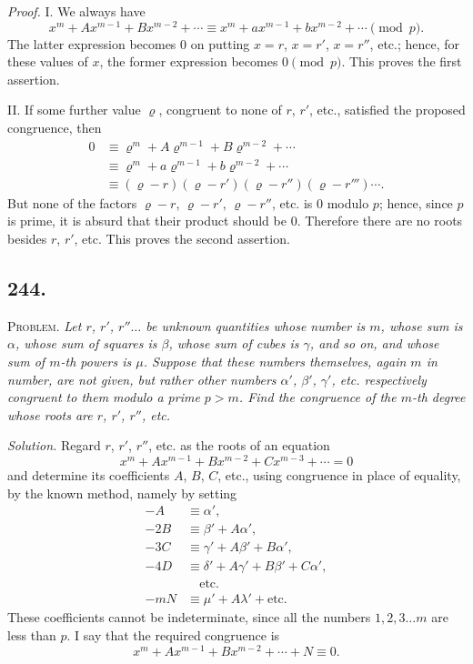 \documentclass[12pt]{article}
\begin{document}
\textit{Proof.} I. We always have
\[
x^m+A x^{m-1}+B x^{m-2}+\cdots \equiv x^m+a x^{m-1}+b x^{m-2}+\cdots \pmod p.
\]
The latter expression becomes $0$ on putting $x=r$, $x=r'$, $x=r''$, etc.; hence, for these values of $x$, the former expression becomes $0\pmod p$. This proves the first assertion.

II. If some further value $\varrho$, congruent to none of $r$, $r'$, etc., satisfied the proposed congruence, then
\[
\begin{aligned}
0&\equiv \varrho^m+A\varrho^{m-1}+B\varrho^{m-2}+\cdots \\
&\equiv \varrho^m+a\varrho^{m-1}+b\varrho^{m-2}+\cdots \\
&\equiv (\varrho-r)(\varrho-r')(\varrho-r'')(\varrho-r''')\cdots .
\end{aligned}
\]
But none of the factors $\varrho-r$, $\varrho-r'$, $\varrho-r''$, etc. is $0$ modulo $p$; hence, since $p$ is prime, it is absurd that their product should be $0$. Therefore there are no roots besides $r$, $r'$, etc. This proves the second assertion.

\subsection*{244.}
\textsc{Problem.} \textit{Let $r$, $r'$, $r''\ldots$ be unknown quantities whose number is $m$, whose sum is $\alpha$, whose sum of squares is $\beta$, whose sum of cubes is $\gamma$, and so on, and whose sum of $m$-th powers is $\mu$. Suppose that these numbers themselves, again $m$ in number, are not given, but rather other numbers $\alpha'$, $\beta'$, $\gamma'$, etc. respectively congruent to them modulo a prime $p>m$. Find the congruence of the $m$-th degree whose roots are $r$, $r'$, $r''$, etc.}

\textit{Solution.} Regard $r$, $r'$, $r''$, etc. as the roots of an equation
\[
x^m+A x^{m-1}+B x^{m-2}+C x^{m-3}+\cdots=0
\]
and determine its coefficients $A$, $B$, $C$, etc., using congruence in place of equality, by the known method, namely by setting
\[
\begin{aligned}
-A&\equiv \alpha',\\
-2B&\equiv \beta' + A\alpha',\\
-3C&\equiv \gamma' + A\beta' + B\alpha',\\
-4D&\equiv \delta' + A\gamma' + B\beta' + C\alpha',\\
&\quad\text{etc.}\\
-mN&\equiv \mu' + A\lambda' + \text{etc.}
\end{aligned}
\]
These coefficients cannot be indeterminate, since all the numbers $1,2,3\ldots m$ are less than $p$. I say that the required congruence is
\[
x^m+A x^{m-1}+B x^{m-2}+\cdots+N\equiv 0.
\]
\end{document}
